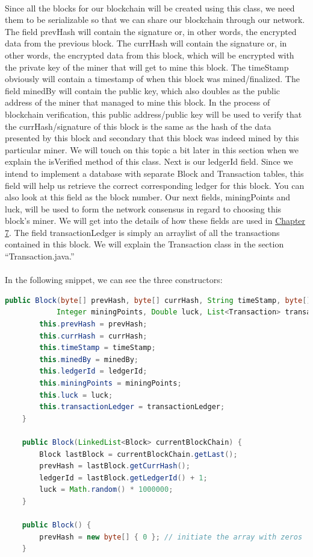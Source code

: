 \documentclass[12pt,a4paper]{report}
\begin{document}
\paragraph{}
Since all the blocks for our blockchain will be created using this class, we need them to be serializable so that we can share our blockchain through our network.
The field prevHash will contain the signature or, in other words, the encrypted data from the previous block. The currHash will contain the signature or, in other words, the encrypted data from this block, which will be encrypted with the private key of the miner that will get to mine this block. The timeStamp obviously will contain a timestamp of when this block was mined/finalized. The field minedBy will contain the public key, which also doubles as the public address of the miner that managed to mine this block. In the process of blockchain verification, this public address/public key will be used to verify that the currHash/signature of this block is the same as the hash of the data presented by this block and secondary that this block was indeed mined by this particular miner. 
 We will touch on this topic a bit later in this section when we explain the isVerified method of this class. Next is our ledgerId field. Since we intend to implement a database with separate Block and Transaction tables, this field will help us retrieve the correct corresponding ledger for this block. You can also look at this field as the block number. Our next fields, miningPoints and luck, will be used to form the network consensus in regard to choosing this block’s miner.
We will get into the details of how these fields are used in \hyperref[chapter Service Layer]{Chapter 7}. The field transactionLedger is simply an arraylist of all the transactions contained in this block. We will explain the Transaction class in the section “Transaction.java.”
\paragraph{}
In the following snippet, we can see the three constructors:
\begin{lstlisting}[language=Java]
    public Block(byte[] prevHash, byte[] currHash, String timeStamp, byte[] minedBy, Integer ledgerId,
            Integer miningPoints, Double luck, List<Transaction> transactionLedger) {
        this.prevHash = prevHash;
        this.currHash = currHash;
        this.timeStamp = timeStamp;
        this.minedBy = minedBy;
        this.ledgerId = ledgerId;
        this.miningPoints = miningPoints;
        this.luck = luck;
        this.transactionLedger = transactionLedger;
    }

    public Block(LinkedList<Block> currentBlockChain) {
        Block lastBlock = currentBlockChain.getLast();
        prevHash = lastBlock.getCurrHash();
        ledgerId = lastBlock.getLedgerId() + 1;
        luck = Math.random() * 1000000;
    }

    public Block() {
        prevHash = new byte[] { 0 }; // initiate the array with zeros
    }
\end{lstlisting}
\end{document}

